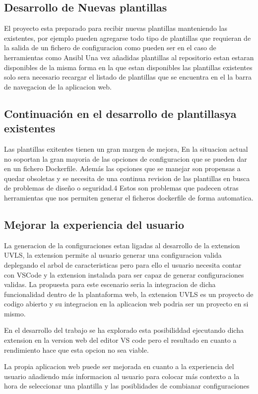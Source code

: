 \documentclass[12pt, a4paper, twoside]{article}
\begin{document}
\subsection{Desarrollo de Nuevas plantillas }
El proyecto esta preparado para recibir nuevas plantillas manteniendo las existentes, por ejemplo pueden agregarse todo tipo de plantillas que requieran de la salida de un fichero de configuracion como pueden ser en el caso de herramientas como Ansibl \cite{ansible}	 
Una vez añadidas plantillas al repositorio estan estaran disponibles de la misma forma en la que estan disponibles las plantillas existentes solo sera necesario recargar el listado de plantillas que se encuentra en el la barra de navegacion de la aplicacion web.	
\subsection{Continuación en el desarrollo de plantillasya existentes}
Las plantillas exitentes tienen un gran margen de mejora, En la situacion actual no soportan la gran mayoria de las opciones de configuracion que se pueden dar en un fichero Dockerfile. Además las opciones que se manejar son propensas a quedar obsoletas y se necesita de una continua revision de las plantillas en busca de problemas de diseño o seguridad.4
Estos son problemas que padecen otras herramientas que nos permiten generar el ficheros dockerfile de forma automatica.

\subsection{Mejorar la experiencia del usuario }
La generacion de la configuraciones estan ligadas al desarrollo de la extension UVLS, la extension permite al usuario generar una configuracion valida deplegando el arbol de caracteristicas pero para ello el usuario
necesita contar con VSCode y la extension instalada para ser capaz de generar configuraciones validas. La propuesta para este escenario seria la integracion de dicha funcionalidad dentro de la plantaforma web,
la extension UVLS es un proyecto de codigo abierto y su integracion en la aplicacion web podria ser un proyecto en si mismo. 

En el desarrollo del trabajo se ha explorado esta posibiliddad ejecutando dicha extension en la version
web del editor VS code pero el resultado en cuanto a rendimiento hace que esta opcion no sea viable.

La propia aplicacion web puede ser mejorada en cuanto a la experiencia del usuario añadiendo más informacion al usuario para colocar más contexto a la hora de seleccionar una plantilla y las posiblidades de combianar configuraciones 
\end{document}
